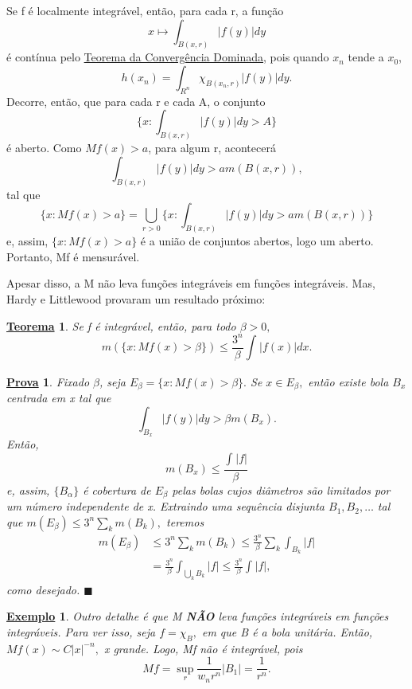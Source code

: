 \documentclass{article}
\newtheorem*{theorem*}{\underline{Teorema}}
\newtheorem{example}{\underline{Exemplo}}
\newtheorem*{proof*}{\underline{Prova}}
\renewcommand\qedsymbol{$\blacksquare$}
\begin{document}
  Se f é localmente integrável, então, para cada r, a função 
    \[
      x\mapsto \int_{B(x, r)}|f(y)| dy
    \]
  é contínua pelo \hyperlink{dominated_convergence}{Teorema da Convergência Dominada}, pois quando \(x_{n}\) tende a \(x_{0}\), 
    \[
      h(x_{n}) = \int_{R^{n}}\chi_{B(x_{n}, r)}|f(y)| dy.
    \]
  Decorre, então, que para cada r e cada A, o conjunto 
    \[
      \biggl\{x: \int_{B(x, r)}|f(y)| dy  > A\biggr\}
    \]
  é aberto. Como \(Mf(x) > a\), para algum r, acontecerá 
    \[
      \int_{B(x, r)}|f(y)| dy > am(B(x, r)),
    \]
  tal que 
    \[
      \{x: Mf(x) > a\} = \bigcup_{r>0}^{}\biggl\{x: \int_{B(x, r)}|f(y)| dy > am(B(x, r))\biggr\}
    \]
  e, assim, \(\{x: Mf(x) > a\}\) é a união de conjuntos abertos, logo um aberto. Portanto, Mf é mensurável.

  Apesar disso, a M não leva funções integráveis em funções integráveis. Mas, Hardy e Littlewood provaram um resultado próximo: 
 \begin{theorem*}
   Se f é integrável, então, para todo \(\beta > 0,\) 
     \[
       m(\{x: Mf(x) > \beta \})\leq \frac{3^{n}}{\beta }\int_{}^{}|f(x)|dx.
     \]
 \end{theorem*}
\begin{proof*}
  Fixado \(\beta \), seja \(E_{\beta } = \{x: Mf(x) > \beta \}.\) Se \(x\in E_{\beta },\) então existe bola \(B_{x}\) centrada em x tal que 
    \[
      \int_{B_{x}}|f(y)| dy > \beta m (B_{x}).
    \]
  Então, 
    \[
      m(B_{x}) \leq \frac{\int_{}^{}|f|}{\beta }
    \]
  e, assim, \(\{B_{\alpha }\}\) é cobertura de \(E_{\beta }\) pelas bolas cujos diâmetros são limitados por um número independente de x. Extraindo uma sequência disjunta \(B_{1}, B_2, \dotsc \) tal que \(m(E_{\beta }) \leq 3^{n}\sum\limits_{k}^{}m(B_{k}),\) teremos 
 \begin{align*}
   m(E_{\beta }) &\leq 3^{n}\sum\limits_{k}^{}m(B_{k}) \leq \frac{3^{n}}{\beta }\sum\limits_{k}^{}\int_{B_{k}}|f|\\ 
                 &= \frac{3^{n}}{\beta }\int_{\bigcup_{k}^{}B_{k}}|f| \leq \frac{3^{n}}{\beta }\int_{}^{}|f|,
 \end{align*}
  como desejado. \qedsymbol
\end{proof*}
 \begin{example}
  Outro detalhe é que M \textbf{NÃO} leva funções integráveis em funções integráveis. Para ver isso, seja \(f = \chi_{B},\) em que B é a bola unitária. Então, \(Mf(x)\sim C|x|^{-n},\) x grande. Logo, Mf não é integrável, pois 
    \[
      Mf = \sup_{r}\frac{1}{w_{n}r^{n}}|B_1| = \frac{1}{r^{n}}.
    \]
 \end{example}
\end{document}
